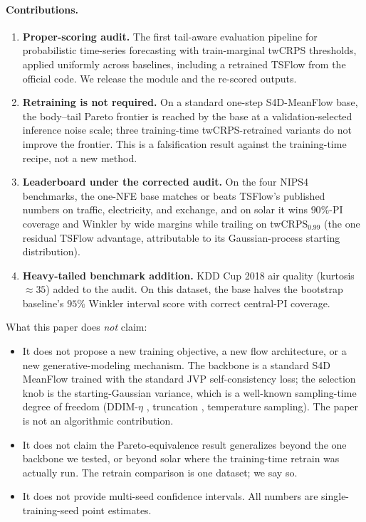 \documentclass{article}
\begin{document}
\paragraph{Contributions.}
\begin{enumerate}
\item \textbf{Proper-scoring audit.} The first tail-aware evaluation
pipeline for probabilistic time-series forecasting with
train-marginal twCRPS thresholds, applied uniformly across baselines,
including a retrained TSFlow from the official code. We release the
module and the re-scored outputs.
\item \textbf{Retraining is not required.} On a standard one-step
S4D-MeanFlow base, the body--tail Pareto frontier is reached by the
base at a validation-selected inference noise scale; three
training-time twCRPS-retrained variants do not improve the frontier.
This is a falsification result against the training-time recipe, not
a new method.
\item \textbf{Leaderboard under the corrected audit.} On the four
NIPS4 benchmarks, the one-NFE base matches or beats TSFlow's
published numbers on traffic, electricity, and exchange, and on
solar it wins $90\%$-PI coverage and Winkler by wide margins while
trailing on twCRPS$_{0.99}$ (the one residual TSFlow advantage,
attributable to its Gaussian-process starting distribution).
\item \textbf{Heavy-tailed benchmark addition.} KDD Cup 2018 air
quality (kurtosis $\approx 35$) added to the audit. On this
dataset, the base halves the bootstrap baseline's $95\%$ Winkler
interval score with correct central-PI coverage.
\end{enumerate}

What this paper does \emph{not} claim:
\begin{itemize}
\item It does not propose a new training objective, a new flow
architecture, or a new generative-modeling mechanism. The backbone
is a standard S4D~\cite{s4d} MeanFlow trained with the standard JVP
self-consistency loss; the selection knob is the starting-Gaussian
variance, which is a well-known sampling-time degree of freedom
(DDIM-$\eta$ \cite{ddim}, truncation \cite{biggan}, temperature
sampling). The paper is not an algorithmic contribution.
\item It does not claim the Pareto-equivalence result generalizes
beyond the one backbone we tested, or beyond solar where the
training-time retrain was actually run. The retrain comparison is
one dataset; we say so.
\item It does not provide multi-seed confidence intervals. All
numbers are single-training-seed point estimates.
\end{itemize}
\end{document}
